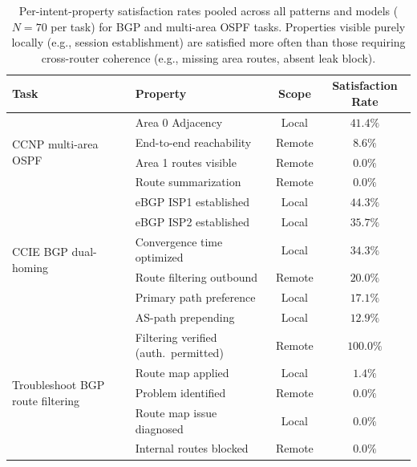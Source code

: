 \begin{table}[H]
\caption{Per-intent-property satisfaction rates pooled across all patterns and models ($N=70$ per task) for BGP and multi-area OSPF tasks. Properties visible purely locally (e.g., session establishment) are satisfied more often than those requiring cross-router coherence (e.g., missing area routes, absent leak block).\label{tab:property_satisfaction}}
\centering
\small
\begin{tabular}{@{}llcc@{}}
\toprule
\textbf{Task} & \textbf{Property} & \textbf{Scope} & \textbf{Satisfaction Rate} \\
\midrule
\multirow{4}{*}{\parbox{2.5cm}{CCNP multi-area OSPF}}
  & Area 0 Adjacency & Local & $41.4\%$ \\
  & End-to-end reachability & Remote & $8.6\%$ \\
  & Area 1 routes visible & Remote & $0.0\%$ \\
  & Route summarization & Remote & $0.0\%$ \\
\midrule
\multirow{6}{*}{\parbox{2.5cm}{CCIE BGP dual-homing}}
  & eBGP ISP1 established & Local & $44.3\%$ \\
  & eBGP ISP2 established & Local & $35.7\%$ \\
  & Convergence time optimized & Local & $34.3\%$ \\
  & Route filtering outbound & Remote & $20.0\%$ \\
  & Primary path preference & Local & $17.1\%$ \\
  & AS-path prepending & Local & $12.9\%$ \\
\midrule
\multirow{5}{*}{\parbox{2.5cm}{Troubleshoot BGP route filtering}}
  & Filtering verified (auth.\ permitted) & Remote & $100.0\%$ \\
  & Route map applied & Local & $1.4\%$ \\
  & Problem identified & Remote & $0.0\%$ \\
  & Route map issue diagnosed & Local & $0.0\%$ \\
  & Internal routes blocked & Remote & $0.0\%$ \\
\bottomrule
\end{tabular}
\end{table}
